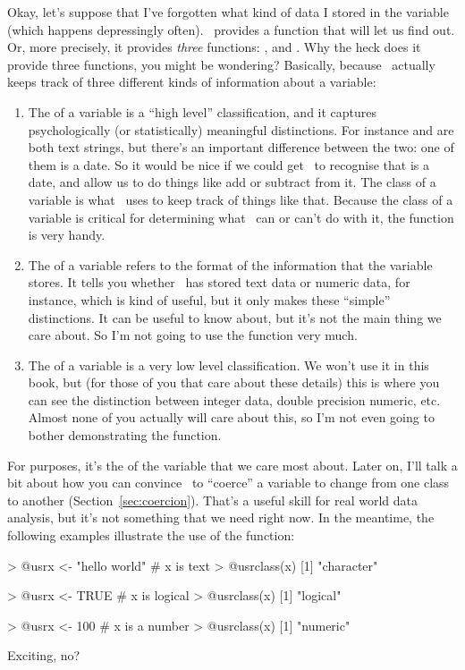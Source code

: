 Okay, let's suppose that I've forgotten what kind of data I stored in the variable  (which happens depressingly often). \R\ provides a function that will let us find out. Or, more precisely, it provides {\it three} functions: ,  and . Why the heck does it provide three functions, you might be wondering? Basically, because \R\ actually keeps track of three different kinds of information about a variable:
\begin{enumerate}
\item The  of a variable is a ``high level'' classification, and it captures psychologically (or statistically) meaningful distinctions. For instance  and  are both text strings, but there's an important difference between the two: one of them is a date. So it would be nice if we could get \R\ to recognise that  is a date, and allow us to do things like add or subtract from it. The class of a variable is what \R\ uses to keep track of things like that. Because the class of a variable is critical for determining what \R\ can or can't do with it, the  function is very handy.
\item The  of a variable refers to the format of the information that the variable stores. It tells you whether \R\ has stored text data or numeric data, for instance, which is kind of useful, but it only makes these ``simple'' distinctions. It can be useful to know about, but it's not the main thing we care about. So I'm not going to use the  function very much. 
\item The  of a variable is a very low level classification. We won't use it in this book, but (for those of you that care about these details) this is where you can see the distinction between integer data, double precision numeric, etc. Almost none of you actually will care about this, so I'm not even going to bother demonstrating the  function.
\end{enumerate}

\noindent
For purposes, it's the  of the variable that we care most about. Later on, I'll talk a bit about how you can convince \R\ to ``coerce'' a variable to change from one class to another (Section~\ref{sec:coercion}). That's a useful skill for real world data analysis, but it's not something that we need right now. In the meantime, the following examples illustrate the use of the  function:
\begin{rblock1}
> @usr{x <- "hello world"}     # x is text
> @usr{class(x)}
[1] "character"

> @usr{x <- TRUE}     # x is logical 
> @usr{class(x)}
[1] "logical"

> @usr{x <- 100}     # x is a number
> @usr{class(x)}
[1] "numeric"
\end{rblock1}
Exciting, no?





